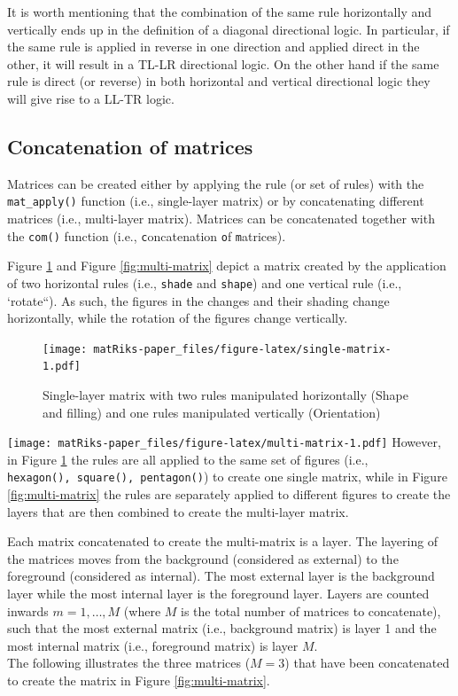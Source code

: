 It is worth mentioning that the combination of the same rule horizontally and vertically ends up in the definition of a diagonal directional logic.
In particular, if the same rule is applied in reverse in one direction and applied direct in the other, it will result in a TL-LR directional logic.
On the other hand if the same rule is direct (or reverse) in both horizontal and vertical directional logic they
will give rise to a LL-TR logic.

\hypertarget{concatenation-of-matrices}{%
\subsection{Concatenation of matrices}\label{concatenation-of-matrices}}

Matrices can be created either by applying the rule (or set of rules) with the \texttt{mat\_apply()} function (i.e., single-layer matrix) or by concatenating different matrices (i.e., multi-layer matrix). Matrices can be concatenated together with the \texttt{com()} function (i.e., \texttt{c}oncatenation \texttt{o}f \texttt{m}atrices).

Figure \ref{fig:single-matrix} and Figure \ref{fig:multi-matrix} depict a matrix created by the application of two horizontal rules (i.e., \texttt{shade} and \texttt{shape}) and one vertical rule (i.e., `rotate``). As such, the figures in the changes and their shading change horizontally, while the rotation of the figures change vertically.

\begin{figure}
\centering
\texttt{[image: matRiks-paper\_files/figure-latex/single-matrix-1.pdf]}
\caption{\label{fig:single-matrix}Single-layer matrix with two rules manipulated horizontally (Shape and filling) and one rules manipulated vertically (Orientation)}
\end{figure}

\texttt{[image: matRiks-paper\_files/figure-latex/multi-matrix-1.pdf]}
However, in Figure \ref{fig:single-matrix} the rules are all applied to the same set of figures (i.e., \texttt{hexagon(),\ square(),\ pentagon()}) to create one single matrix, while in Figure \ref{fig:multi-matrix} the rules are separately applied to different figures to create the layers that are then combined to create the multi-layer matrix.

Each matrix concatenated to create the multi-matrix is a layer. The layering of the matrices moves from the background (considered as external) to the foreground (considered as internal). The most external layer is the background layer while the most internal layer is the foreground layer.
Layers are counted inwards \(m = 1, \ldots, M\) (where \(M\) is the total number of matrices to concatenate), such that the most external matrix (i.e., background matrix) is layer 1 and the most internal matrix (i.e., foreground matrix) is layer \(M\).\\
The following illustrates the three matrices (\(M = 3\)) that have been concatenated to create the matrix in Figure \ref{fig:multi-matrix}.

